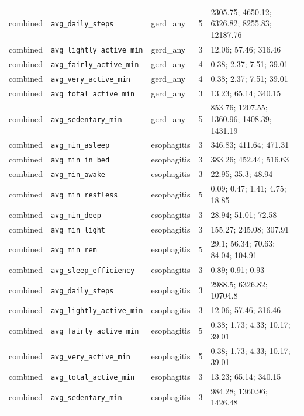 \documentclass[11pt]{article}
\newcommand{\code}[1]{\texttt{\small #1}}
\begin{document}
\begin{longtable}{@{}p{1.7cm}p{3.2cm}p{2.0cm}c p{5.4cm}@{}}
combined & \code{avg\_daily\_steps} & gerd\_any & 5 & 2305.75; 4650.12; 6326.82; 8255.83; 12187.76 \\
combined & \code{avg\_lightly\_active\_min} & gerd\_any & 3 & 12.06; 57.46; 316.46 \\
combined & \code{avg\_fairly\_active\_min} & gerd\_any & 4 & 0.38; 2.37; 7.51; 39.01 \\
combined & \code{avg\_very\_active\_min} & gerd\_any & 4 & 0.38; 2.37; 7.51; 39.01 \\
combined & \code{avg\_total\_active\_min} & gerd\_any & 3 & 13.23; 65.14; 340.15 \\
combined & \code{avg\_sedentary\_min} & gerd\_any & 5 & 853.76; 1207.55; 1360.96; 1408.39; 1431.19 \\
combined & \code{avg\_min\_asleep} & esophagitis & 3 & 346.83; 411.64; 471.31 \\
combined & \code{avg\_min\_in\_bed} & esophagitis & 3 & 383.26; 452.44; 516.63 \\
combined & \code{avg\_min\_awake} & esophagitis & 3 & 22.95; 35.3; 48.94 \\
combined & \code{avg\_min\_restless} & esophagitis & 5 & 0.09; 0.47; 1.41; 4.75; 18.85 \\
combined & \code{avg\_min\_deep} & esophagitis & 3 & 28.94; 51.01; 72.58 \\
combined & \code{avg\_min\_light} & esophagitis & 3 & 155.27; 245.08; 307.91 \\
combined & \code{avg\_min\_rem} & esophagitis & 5 & 29.1; 56.34; 70.63; 84.04; 104.91 \\
combined & \code{avg\_sleep\_efficiency} & esophagitis & 3 & 0.89; 0.91; 0.93 \\
combined & \code{avg\_daily\_steps} & esophagitis & 3 & 2988.5; 6326.82; 10704.8 \\
combined & \code{avg\_lightly\_active\_min} & esophagitis & 3 & 12.06; 57.46; 316.46 \\
combined & \code{avg\_fairly\_active\_min} & esophagitis & 5 & 0.38; 1.73; 4.33; 10.17; 39.01 \\
combined & \code{avg\_very\_active\_min} & esophagitis & 5 & 0.38; 1.73; 4.33; 10.17; 39.01 \\
combined & \code{avg\_total\_active\_min} & esophagitis & 3 & 13.23; 65.14; 340.15 \\
combined & \code{avg\_sedentary\_min} & esophagitis & 3 & 984.28; 1360.96; 1426.48 \\
\bottomrule \end{longtable}\normalsize
\end{document}

